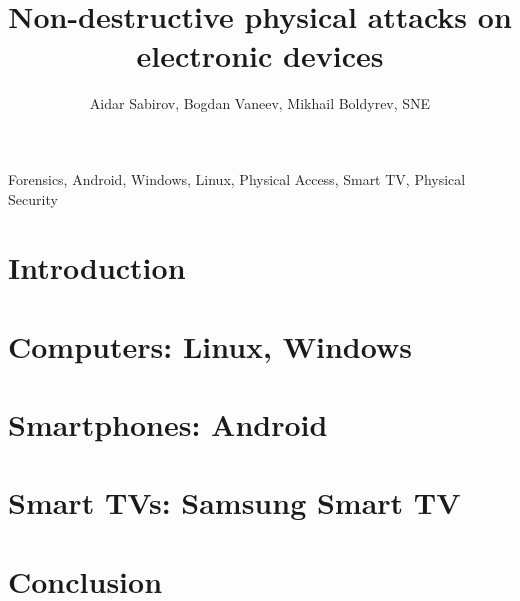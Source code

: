 \documentclass[journal]{IEEEtran}
\begin{document}
\title{Non-destructive physical attacks on electronic devices}
\author{Aidar Sabirov, Bogdan Vaneev, Mikhail Boldyrev, SNE}
%
{}
\maketitle

\begin{abstract}

\end{abstract}

\begin{IEEEkeywords}
Forensics, Android, Windows, Linux, Physical Access, Smart TV, Physical Security
\end{IEEEkeywords}

\IEEEpeerreviewmaketitle



\section{Introduction}


\section{Computers: Linux, Windows}



\section{Smartphones: Android}


\section{Smart TVs: Samsung Smart TV}


\section{Conclusion}


\ifCLASSOPTIONcaptionsoff
  \newpage
\fi


\appendices


\newpage


\end{document}
